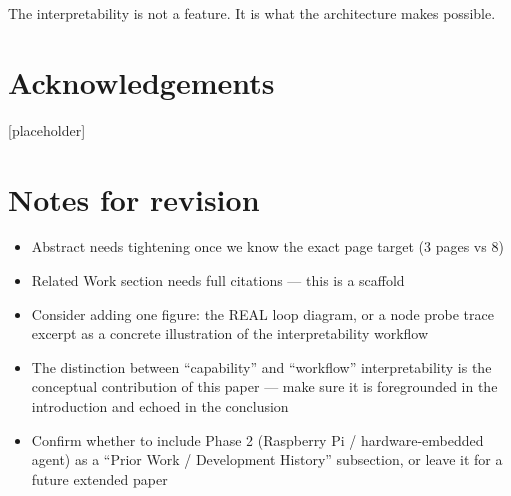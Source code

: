 \documentclass[letterpaper]{article}
\begin{document}
The interpretability is not a feature. It is what the architecture makes possible.

\section{Acknowledgements}

[placeholder]

\footnotesize



\section*{Notes for revision}
\begin{itemize}
    \item Abstract needs tightening once we know the exact page target (3 pages vs 8)
    \item Related Work section needs full citations — this is a scaffold
    \item Consider adding one figure: the REAL loop diagram, or a node probe trace excerpt as a concrete illustration of the interpretability workflow
    \item The distinction between ``capability'' and ``workflow'' interpretability is the conceptual contribution of this paper — make sure it is foregrounded in the introduction and echoed in the conclusion
    \item Confirm whether to include Phase 2 (Raspberry Pi / hardware-embedded agent) as a ``Prior Work / Development History'' subsection, or leave it for a future extended paper
\end{itemize}
\end{document}
